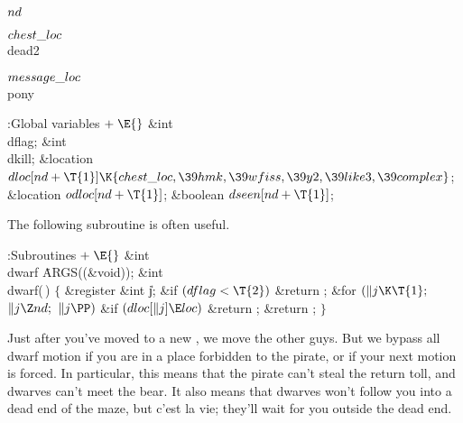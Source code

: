 \Y\B\4\D$\\{nd}$ \5
\par
\B\4\D$\\{chest\_loc}$ \5
\\{dead2}\par
\B\4\D$\\{message\_loc}$ \5
\\{pony}\par
\Y\B\4:Global variables\X${}\mathrel+\E{}$\6
\&{int} \\{dflag};\6
\&{int} \\{dkill};\6
\&{location} ${}\\{dloc}[\\{nd}+\T{1}]\K\{\\{chest\_loc},\39\\{hmk},\39\\{wfiss},\39\\{y2},\39\\{like3},\39\\{complex}\}{}$;\6
\&{location} ${}\\{odloc}[\\{nd}+\T{1}]{}$;\6
\&{boolean} ${}\\{dseen}[\\{nd}+\T{1}]{}$;\par
\fi

The following subroutine is often useful.

\Y\B\4:Subroutines\X${}\mathrel+\E{}$\6
\&{int} \\{dwarf}\,\,\.{ARGS}((\&{void}));\7
\&{int} \\{dwarf}(\,)\6
${}\{{}$\1\6
\&{register} \&{int} \|j;\7
\&{if} ${}(\\{dflag}<\T{2}){}$\1\5
\&{return} ;\2\6
\&{for} ${}(\|j\K\T{1};{}$ ${}\|j\Z\\{nd};{}$ ${}\|j\PP){}$\1\6
\&{if} ${}(\\{dloc}[\|j]\E\\{loc}){}$\1\5
\&{return} ;\2\2\6
\&{return} ;\6
\4${}\}{}$\2\par
\fi

Just after you've moved to a new , we move the other guys.
But we bypass all dwarf motion if you are in a place forbidden
to the pirate, or if your next motion is forced. In particular,
this means that the pirate can't steal the return toll, and
dwarves can't meet the bear.  It also means that dwarves won't
follow you into a dead end of the maze, but c'est la vie; they'll
wait for you outside the dead end.

